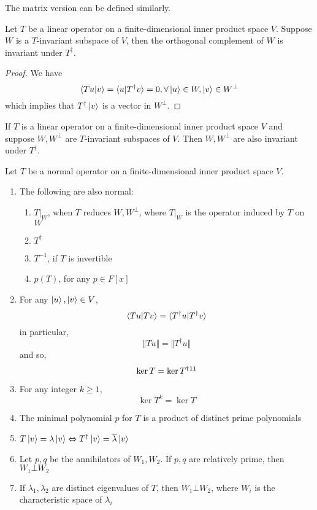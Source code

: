 \documentclass{article}
\begin{document}
The matrix version can be defined similarly.
\begin{thm}
	Let $T$ be a linear operator on a finite-dimensional inner product space $V$. Suppose $W$ is a $T$-invariant subspace of $V$, then the orthogonal complement of $W$ is invariant under $T^\dagger$.
\end{thm}
\begin{proof}
	We have
	\[\braket{Tu|v}=\braket{u|T^\dagger v}=0,\forall\ket{u}\in W,\ket{v}\in W^\bot\]
	which implies that $T^\dagger\ket{v}$ is a vector in $W^\bot$.
\end{proof}
\begin{coro}
	If $T$ is a linear operator on a finite-dimensional inner product space $V$ and suppose $W,W^\bot$ are $T$-invariant subspaces of $V$. Then $W,W^\bot$ are also invariant under $T^\dagger$.
\end{coro}
\begin{thm}\label{ThepropertyofNormalOperator}
	Let $T$ be a normal operator on a finite-dimensional inner product space $V$.
	\begin{enumerate}
		\item The following are also normal:
		\begin{enumerate}
			\item $T|_W$, when $T$ reduces $W,W^\bot$, where $T|_W$ is the operator induced by $T$ on $W$
			\item $T^\dagger$
			\item $T^{-1}$, if $T$ is invertible
			\item $p(T)$, for any $p\in F[x]$
		\end{enumerate}
		\item For any $\ket{u},\ket{v}\in V$,
		\[\braket{Tu|Tv}=\braket{T^\dagger u|T^\dagger v}\]
		in particular,
		\[\Vert Tu\Vert=\Vert T^\dagger u\Vert\]
		and so,
		\[\ker T=\ker T^\dagger\footnotemark[11]\]
		\item For any integer $k\ge1$,
		\[\ker T^k=\ker T\]
		\item The minimal polynomial $p$ for $T$ is a product of distinct prime polynomials
		\item $T\ket{v}=\lambda\ket{v}\Leftrightarrow T^\dagger\ket{v}=\overline{\lambda}\ket{v}$
		\item Let $p,q$ be the annihilators of $W_1,W_2$. If $p,q$ are relatively prime, then $W_1\bot W_2$
		\item If $\lambda_1,\lambda_2$ are distinct eigenvalues of $T$, then $W_1\bot W_2$, where $W_i$ is the characteristic space of $\lambda_i$
	\end{enumerate}
\end{thm}
\end{document}
